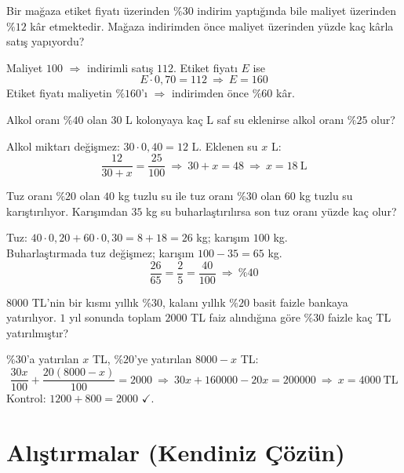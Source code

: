 \begin{alistirma}
Bir mağaza etiket fiyatı üzerinden \(\%30\) indirim yaptığında bile maliyet üzerinden \(\%12\) kâr etmektedir. Mağaza indirimden önce maliyet üzerinden yüzde kaç kârla satış yapıyordu?
\end{alistirma}
\begin{cozum}
Maliyet \(100\) \(\Rightarrow\) indirimli satış \(112\). Etiket fiyatı \(E\) ise
\[E\cdot 0{,}70=112\ \Rightarrow\ E=160\]
Etiket fiyatı maliyetin \(\%160\)'ı \(\Rightarrow\) indirimden önce \(\%60\) kâr.
\end{cozum}

\begin{alistirma}
Alkol oranı \(\%40\) olan \(30\) L kolonyaya kaç L saf su eklenirse alkol oranı \(\%25\) olur?
\end{alistirma}
\begin{cozum}
Alkol miktarı değişmez: \(30\cdot 0{,}40=12\) L. Eklenen su \(x\) L:
\[\frac{12}{30+x}=\frac{25}{100}\ \Rightarrow\ 30+x=48\ \Rightarrow\ x=18\ \text{L}\]
\end{cozum}

\begin{alistirma}
Tuz oranı \(\%20\) olan \(40\) kg tuzlu su ile tuz oranı \(\%30\) olan \(60\) kg tuzlu su karıştırılıyor. Karışımdan \(35\) kg su buharlaştırılırsa son tuz oranı yüzde kaç olur?
\end{alistirma}
\begin{cozum}
Tuz: \(40\cdot 0{,}20+60\cdot 0{,}30=8+18=26\) kg; karışım \(100\) kg.\\
Buharlaştırmada tuz değişmez; karışım \(100-35=65\) kg.
\[\frac{26}{65}=\frac{2}{5}=\frac{40}{100}\ \Rightarrow\ \%40\]
\end{cozum}

\begin{alistirma}
\(8000\) TL'nin bir kısmı yıllık \(\%30\), kalanı yıllık \(\%20\) basit faizle bankaya yatırılıyor. \(1\) yıl sonunda toplam \(2000\) TL faiz alındığına göre \(\%30\) faizle kaç TL yatırılmıştır?
\end{alistirma}
\begin{cozum}
\(\%30\)'a yatırılan \(x\) TL, \(\%20\)'ye yatırılan \(8000-x\) TL:
\[\frac{30x}{100}+\frac{20(8000-x)}{100}=2000\ \Rightarrow\ 30x+160000-20x=200000\ \Rightarrow\ x=4000\ \text{TL}\]
Kontrol: \(1200+800=2000\) \(\checkmark\).
\end{cozum}

\kendinizoncesi
\section{Alıştırmalar (Kendiniz Çözün)}

